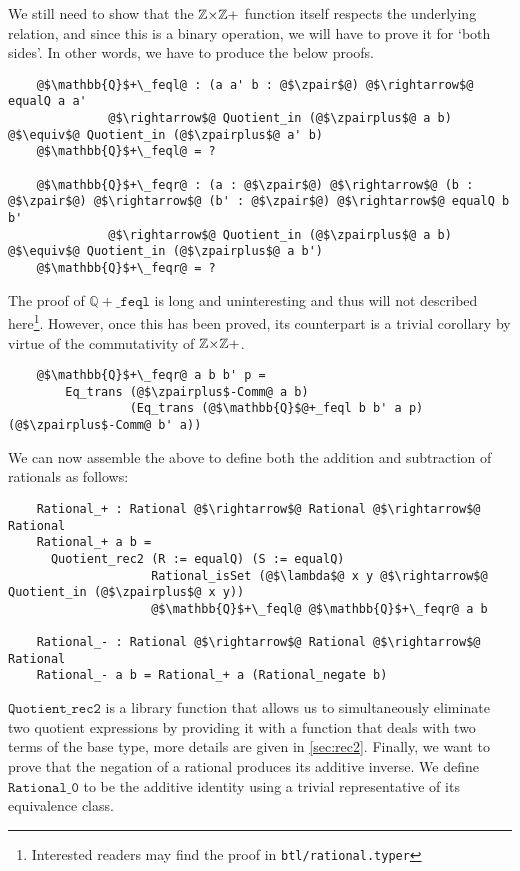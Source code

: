 \documentclass[12pt,twoside,maitrise]{dms}
\theoremstyle{definition}
\numberwithin{equation}{section}
\numberwithin{table}{chapter}
\numberwithin{figure}{chapter}
\newcommand\id[1] {\texttt{#1}}
\begin{document}
We still need to show that the $\mathbb{Z}{\times}\mathbb{Z}+$ function itself respects the
underlying relation, and since this is a binary operation, we will have to prove
it for `both sides'. In other words, we have to produce the below proofs.

\begin{verbatim}
    @$\mathbb{Q}$+\_feql@ : (a a' b : @$\zpair$@) @$\rightarrow$@ equalQ a a'
              @$\rightarrow$@ Quotient_in (@$\zpairplus$@ a b) @$\equiv$@ Quotient_in (@$\zpairplus$@ a' b)
    @$\mathbb{Q}$+\_feql@ = ?

    @$\mathbb{Q}$+\_feqr@ : (a : @$\zpair$@) @$\rightarrow$@ (b : @$\zpair$@) @$\rightarrow$@ (b' : @$\zpair$@) @$\rightarrow$@ equalQ b b'
              @$\rightarrow$@ Quotient_in (@$\zpairplus$@ a b) @$\equiv$@ Quotient_in (@$\zpairplus$@ a b')
    @$\mathbb{Q}$+\_feqr@ = ?
\end{verbatim}

The proof of $\mathbb{Q}{+}\_\id{feql}$ is long and uninteresting and thus will
not described here\footnote{Interested readers may find the proof in
\id{btl/rational.typer}}. However, once this has been proved, its counterpart is
a trivial corollary by virtue of the commutativity of $\mathbb{Z}{\times}\mathbb{Z}+$.

\begin{verbatim}
    @$\mathbb{Q}$+\_feqr@ a b b' p =
        Eq_trans (@$\zpairplus$-Comm@ a b)
                 (Eq_trans (@$\mathbb{Q}$@+_feql b b' a p) (@$\zpairplus$-Comm@ b' a))
\end{verbatim}

We can now assemble the above to define both the addition and subtraction of
rationals as follows:

\begin{verbatim}
    Rational_+ : Rational @$\rightarrow$@ Rational @$\rightarrow$@ Rational
    Rational_+ a b =
      Quotient_rec2 (R := equalQ) (S := equalQ)
                    Rational_isSet (@$\lambda$@ x y @$\rightarrow$@ Quotient_in (@$\zpairplus$@ x y))
                    @$\mathbb{Q}$+\_feql@ @$\mathbb{Q}$+\_feqr@ a b

    Rational_- : Rational @$\rightarrow$@ Rational @$\rightarrow$@ Rational
    Rational_- a b = Rational_+ a (Rational_negate b)
\end{verbatim}

$\id{Quotient\_rec2}$ is a library function that allows us to simultaneously
eliminate two quotient expressions by providing it with a function that deals
with two terms of the base type, more details are given in \autoref{sec:rec2}.
Finally, we want to prove that the negation of a rational produces its additive
inverse. We define $\id{Rational\_0}$ to be the additive identity using a
trivial representative of its equivalence class.
\end{document}
